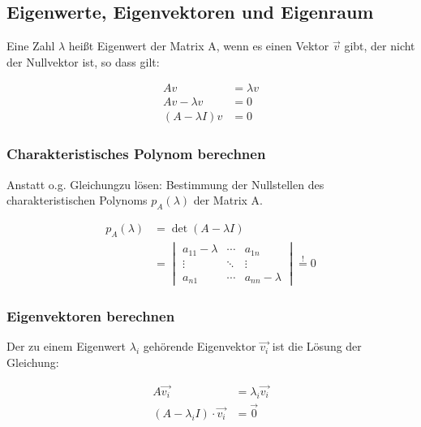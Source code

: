 
\subsection{Eigenwerte, Eigenvektoren und Eigenraum}

Eine Zahl \(\lambda\) heißt Eigenwert der Matrix A, wenn es einen Vektor \(\vec{v}\) gibt, der nicht der Nullvektor ist, so dass gilt:

\begin{equation*}
    \begin{split}
        A v &= \lambda v \\
        A v - \lambda v &= 0 \\
        (A - \lambda I) v &= 0
    \end{split}
\end{equation*}


\subsubsection{Charakteristisches Polynom berechnen}
\label{sec:charPolynom}
Anstatt o.g. Gleichungzu lösen: Bestimmung der Nullstellen des charakteristischen Polynoms \(p_A(\lambda)\) der Matrix A.

\begin{equation*}
    \begin{split}
    p_A(\lambda) & = \det(A - \lambda I) \\
    & = \begin{vmatrix}
    a_{11} - \lambda & \cdots & a_{1n} \\
    \vdots & \ddots & \vdots \\
    a_{n1} & \cdots & a_{nn} - \lambda
    \end{vmatrix} \overset{!}{=} 0
    \end{split}
\end{equation*}

\subsubsection{Eigenvektoren berechnen}
Der zu einem Eigenwert \(\lambda_i\) gehörende Eigenvektor \(\vec{v_i}\) ist die Lösung der Gleichung:

\begin{equation*}
    \begin{split}
        A\vec{v_i} &= \lambda_i \vec{v_i} \\
        (A - \lambda_i I) \cdot \vec{v_i} &= \vec{0}
    \end{split}
\end{equation*}

